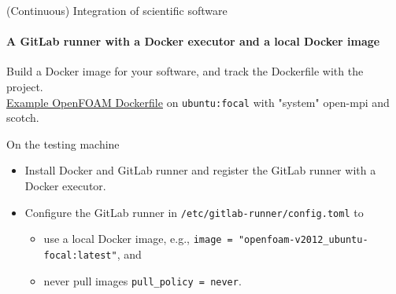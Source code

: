 \begin{frame}{(Continuous) Integration of scientific software} 
    \framesubtitle{A GitLab runner with a Docker executor and a local Docker image}

    \vfill 
    Build a Docker image for your software, and track the Dockerfile with the project.\\
    \medskip
    \href{https://gitlab.com/tmaric/fvc-reconstruct/-/tree/main/docker}{Example OpenFOAM Dockerfile} on \texttt{ubuntu:focal} with "system" open-mpi and scotch.

    \medskip
    On the testing machine
    \begin{itemize}
        \item Install Docker and GitLab runner and register the GitLab runner with a Docker executor.
        \item Configure the GitLab runner in \texttt{/etc/gitlab-runner/config.toml} to
            \begin{itemize}
                \item use a local Docker image, e.g., \texttt{image = "openfoam-v2012\_ubuntu-focal:latest"}, and
                \item never pull images \texttt{pull\_policy = never}.
            \end{itemize}
    \end{itemize}

\end{frame}

